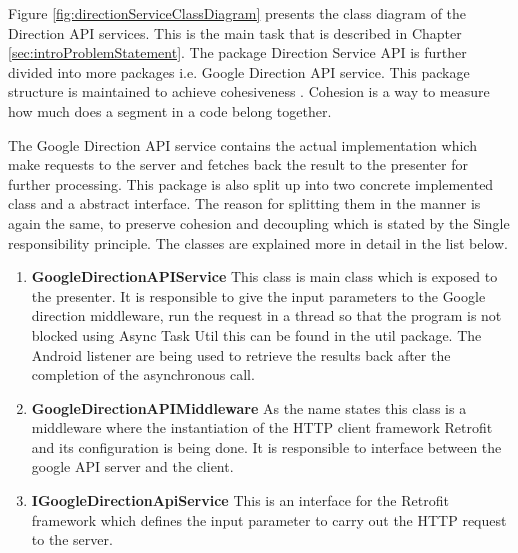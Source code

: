     \par
        \label{ssec:srp}
        Figure \ref{fig:directionServiceClassDiagram} presents the class diagram
        of the Direction API services. This is the main task that is described
        in Chapter \ref{sec:introProblemStatement}.
        The package Direction Service API is further divided 
        into more packages i.e. Google Direction API service. This package 
        structure is maintained to achieve cohesiveness \cite{AdamCarlson}. Cohesion
        is a way to measure how much does a segment in a code belong together. 
        
        \par
        The Google Direction API service contains the actual implementation 
        which make requests to the server and fetches back the result to the 
        presenter \cite{mvp} for further processing. This package is also split up into 
        two concrete implemented class and a abstract interface. The reason
        for splitting them in the manner is again the same, to preserve cohesion
        and decoupling which is stated by the Single responsibility principle.
        The classes are explained more in detail in the list below. 
        \begin{enumerate}
            \item 
            \textbf{GoogleDirectionAPIService}
                This class is main class which is exposed to the presenter. It is
                responsible to give the input parameters to the Google direction 
                middleware, run the request in a thread so that the program is not
                blocked using Async Task Util \cite{GoogleAsync}
                this can be found in the util package. The  Android listener
                are being used to 
                retrieve the results back after the completion of the asynchronous call.
            \item 
            \textbf{GoogleDirectionAPIMiddleware}
                As the name states this class is a middleware where the instantiation
                of the HTTP client framework Retrofit \cite{Square} 
                and its configuration is being done. It is responsible
                to interface between the google API server and the client.
            \item 
            \textbf{IGoogleDirectionApiService}
                This is an interface for the Retrofit framework which defines the input
                parameter to carry out the HTTP request to the server.
        \end{enumerate} 


